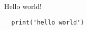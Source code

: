\documentclass{scrbook}
\begin{document}
Hello world!

\begin{verbatim}
  print('hello world')
\end{verbatim}


\end{document}
